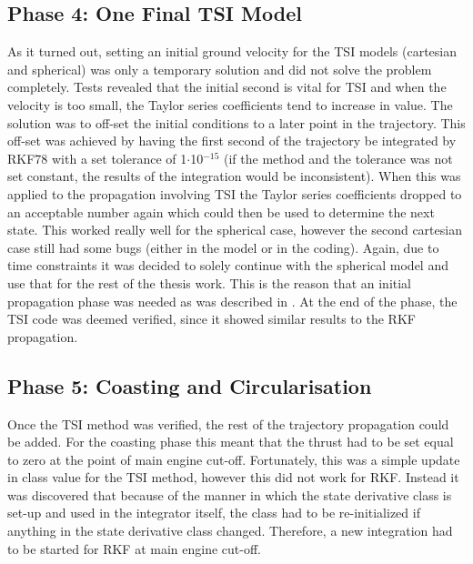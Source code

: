 \subsection{Phase 4: One Final \ac{TSI} Model}
\label{subsec:phase4com}
As it turned out, setting an initial ground velocity for the \ac{TSI} models (cartesian and spherical) was only a temporary solution and did not solve the problem completely. Tests revealed that the initial second is vital for \ac{TSI} and when the velocity is too small, the Taylor series coefficients tend to increase in value. The solution was to off-set the initial conditions to a later point in the trajectory. This off-set was achieved by having the first second of the trajectory be integrated by \ac{RKF78} with a set tolerance of 1$\cdot$10$^{-15}$ (if the method and the tolerance was not set constant, the results of the integration would be inconsistent). When this was applied to the propagation involving \ac{TSI} the Taylor series coefficients dropped to an acceptable number again which could then be used to determine the next state. This worked really well for the spherical case, however the second cartesian case still had some bugs (either in the model or in the coding). Again, due to time constraints it was decided to solely continue with the spherical model and use that for the rest of the thesis work. This is the reason that an initial propagation phase was needed as was described in . At the end of the phase, the \ac{TSI} code was deemed verified, since it showed similar results to the \ac{RKF} propagation. 

\subsection{Phase 5: Coasting and Circularisation}
\label{subsec:phase5com}
Once the \ac{TSI} method was verified, the rest of the trajectory propagation could be added. For the coasting phase this meant that the thrust had to be set equal to zero at the point of main engine cut-off. Fortunately, this was a simple update in class value for the \ac{TSI} method, however this did not work for \ac{RKF}. Instead it was discovered that because of the manner in which the state derivative class is set-up and used in the integrator itself, the class had to be re-initialized if anything in the state derivative class changed. Therefore, a new integration had to be started for \ac{RKF} at main engine cut-off. \\


